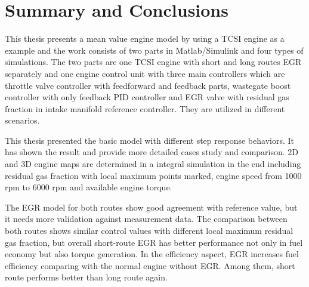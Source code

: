 \chapter{Summary and Conclusions}\label{cha:conclusions}
This thesis presents a mean value engine model by using a TCSI engine 
as a example and the work consists of two parts in Matlab/Simulink and four types of simulations. The two parts are one TCSI engine with short and long routes EGR separately and one engine control unit with three main controllers which are throttle valve controller with feedforward and feedback parts, wastegate boost controller with only feedback PID controller and EGR valve with residual gas fraction in intake manifold reference controller. They are utilized in different scenarios. 

This thesis presented the basic model with different step response behaviors. It has shown the result and provide more detailed cases study and comparison. 2D and 3D engine maps are determined in a integral simulation in the end including residual gas fraction with local maximum points marked, engine speed from 1000 rpm to 6000 rpm and available engine torque.

The EGR model for both routes show good agreement with reference value, but it needs more validation against measurement data. The comparison between both routes shows similar control values with different local maximum residual gas fraction, but overall short-route EGR has better performance not only in fuel economy but also torque generation. In the efficiency aspect, EGR increases fuel efficiency comparing with the normal engine without EGR. Among them, short route performs better than long route again.

\clearpage
